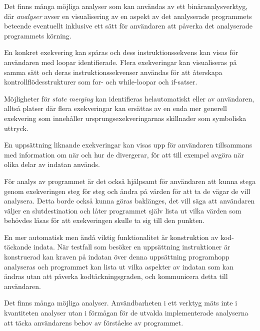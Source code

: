 Det finns många möjliga analyser som kan användas av ett binäranalysverktyg, där
\textit{analyser} avser en visualisering av en aspekt av det analyserade
programmets beteende eventuellt inklusive ett sätt för användaren att påverka
det analyserade programmets körning.

En konkret exekvering kan spåras och dess instruktionssekvens kan visas för
användaren med loopar identifierade. Flera exekveringar kan visualiseras på
samma sätt och deras instruktionssekvenser användas för att återskapa
kontrollflödesstrukturer som for- och while-loopar och if-satser.

Möjligheter för \textit{state merging} kan identifieras helautomatiskt eller av
användaren, alltså platser där flera exekveringar kan ersättas av en enda mer
generell exekvering som innehåller ursprungsexekveringarnas skillnader som
symboliska uttryck.

En uppsättning liknande exekveringar kan visas upp för användaren tillsammans
med information om när och hur de divergerar, för att till exempel avgöra när
olika delar av indatan används.

För analys av programmet är det också hjälpsamt för användaren att kunna stega
genom exekveringen steg för steg och ändra på värden för att ta de vägar de vill
analysera. Detta borde också kunna göras baklänges, det vill säga att användaren
väljer en slutdestination och låter programmet själv lista ut vilka värden som
behövdes läsas för att exekveringen skulle ta sig till den punkten.

En mer automatisk men ändå viktig funktionalitet är konstruktion av kod-täckande
indata. När testfall som besöker en uppsättning instruktioner är konstruerad kan
kraven på indatan över denna uppsättning programhopp analyseras och programmet
kan lista ut vilka aspekter av indatan som kan ändras utan att påverka
kodtäckningsgraden, och kommunicera detta till användaren.

Det finns många möjliga analyser. Användbarheten i ett verktyg mäts inte i
kvantiteten analyser utan i förmågan för de utvalda implementerade analyserna
att täcka användarens behov av förståelse av programmet.

